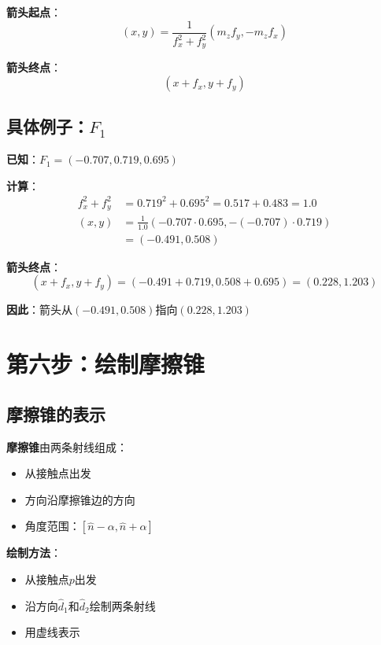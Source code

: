 \documentclass[12pt,a4paper]{article}
\begin{document}
\textbf{箭头起点}：
\begin{equation}
(x, y) = \frac{1}{f_x^2 + f_y^2} (m_z f_y, -m_z f_x)
\end{equation}

\textbf{箭头终点}：
\begin{equation}
(x + f_x, y + f_y)
\end{equation}

\subsection{具体例子：$F_1$}

\textbf{已知}：$F_1 = (-0.707, 0.719, 0.695)$

\textbf{计算}：
\begin{align}
f_x^2 + f_y^2 &= 0.719^2 + 0.695^2 = 0.517 + 0.483 = 1.0 \\
(x, y) &= \frac{1}{1.0} (-0.707 \cdot 0.695, -(-0.707) \cdot 0.719) \\
&= (-0.491, 0.508)
\end{align}

\textbf{箭头终点}：
\begin{equation}
(x + f_x, y + f_y) = (-0.491 + 0.719, 0.508 + 0.695) = (0.228, 1.203)
\end{equation}

\textbf{因此}：箭头从$(-0.491, 0.508)$指向$(0.228, 1.203)$

\section{第六步：绘制摩擦锥}

\subsection{摩擦锥的表示}

\textbf{摩擦锥}由两条射线组成：
\begin{itemize}
\item 从接触点出发
\item 方向沿摩擦锥边的方向
\item 角度范围：$[\hat{n} - \alpha, \hat{n} + \alpha]$
\end{itemize}

\textbf{绘制方法}：
\begin{itemize}
\item 从接触点$p$出发
\item 沿方向$\hat{d}_1$和$\hat{d}_2$绘制两条射线
\item 用虚线表示
\end{itemize}
\end{document}
